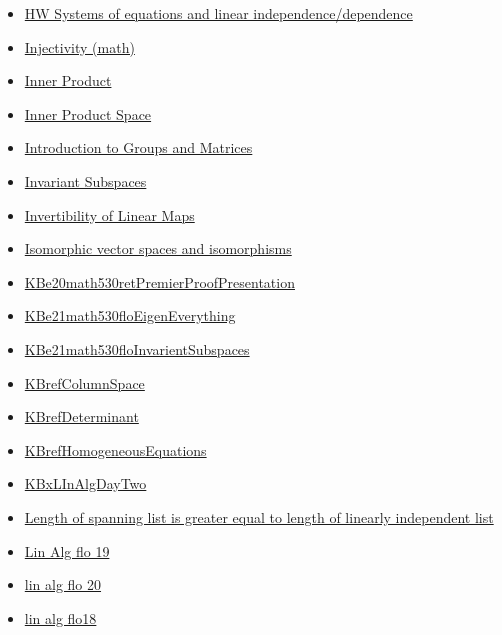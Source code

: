 \documentclass[11pt]{article}
\begin{document}
\begin{itemize}
\begin{itemize}
\begin{itemize}
\item \href{mathematics/linear\_algebra/KBe20math530retSysEquationsLinearInDependence.org}{HW Systems of equations and linear independence/dependence}
\item \href{mathematics/linear\_algebra/KBrefInjective.org}{Injectivity (math)}
\item \href{mathematics/linear\_algebra/KBrefInnerProduct.org}{Inner Product}
\item \href{mathematics/linear\_algebra/KBrefInnerProductSpaces.org}{Inner Product Space}
\item \href{mathematics/linear\_algebra/KBxGroupAndMatricesIntro.org}{Introduction to Groups and Matrices}
\item \href{mathematics/linear\_algebra/KBrefInvariantSubspaces.org}{Invariant Subspaces}
\item \href{mathematics/linear\_algebra/KBrefInvertibleLinearMaps.org}{Invertibility of Linear Maps}
\item \href{mathematics/linear\_algebra/KBrefIsomorphicVectorSpace.org}{Isomorphic vector spaces and isomorphisms}
\item \href{mathematics/linear\_algebra/KBe20math530retPremierProofPresentation.org}{KBe20math530retPremierProofPresentation}
\item \href{mathematics/linear\_algebra/KBe21math530floEigenEverything.org}{KBe21math530floEigenEverything}
\item \href{mathematics/linear\_algebra/KBe21math530floInvarientSubspaces.org}{KBe21math530floInvarientSubspaces}
\item \href{mathematics/linear\_algebra/KBrefColumnSpace.org}{KBrefColumnSpace}
\item \href{mathematics/linear\_algebra/KBrefDeterminant.org}{KBrefDeterminant}
\item \href{mathematics/linear\_algebra/KBrefHomogeneousEquations.org}{KBrefHomogeneousEquations}
\item \href{mathematics/linear\_algebra/KBxLInAlgDayTwo.org}{KBxLInAlgDayTwo}
\item \href{mathematics/linear\_algebra/KBe20math530retProofSpanningListLongerThanLinearIndependent.org}{Length of spanning list is greater equal to length of linearly independent list}
\item \href{mathematics/linear\_algebra/KBe20math530flo19.org}{Lin Alg flo 19}
\item \href{mathematics/linear\_algebra/KBe20math530flo20.org}{lin alg flo 20}
\item \href{mathematics/linear\_algebra/kbe20math530flo18.org}{lin alg flo18}

\end{itemize}
\end{itemize}
\end{itemize}
\end{document}
